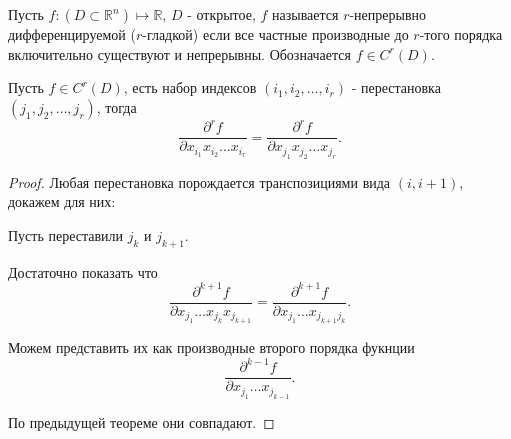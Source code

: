 \begin{definition} \thmslashn 

    Пусть $f : (D \subset \mathbb{R}^{n}) \mapsto \mathbb{R}$, $D$ - открытое, $f$ называется $r$-непрерывно дифференцируемой ($r$-гладкой) если все частные производные до $r$-того порядка включительно существуют и непрерывны. Обозначается $f\in C^{r}(D)$.
\end{definition}
\begin{theorem} \thmslashn

    Пусть $f\in C^{r}(D)$, есть набор индексов $(i_1, i_2, \ldots, i_{r})$ - перестановка $(j_1, j_2, \ldots, j_{r})$, тогда 
    \[ \frac{\partial^{r} f}{\partial x_{i_1}x_{i_2}\ldots x_{i_{r}}} = \frac{\partial^{r} f}{\partial x_{j_1}x_{j_2}\ldots x_{j_{r}}}   .\]
    \begin{proof} \thmslashn
    
        Любая перестановка порождается транспозициями вида $(i, i+1)$, докажем для них: 

        Пусть переставили $j_{k}$ и $j_{k+1}$.

        Достаточно показать что
        \[ \frac{\partial^{k+1} f}{\partial x_{j_1}\ldots x_{j_{k}}x_{j_{k+1}}} = \frac{\partial^{k+1} f}{\partial x_{j_1}\ldots x_{j_{k+1}j_{k}}}   .\]

        Можем представить их как производные второго порядка фукнции
        \[ \frac{\partial^{k-1} f}{\partial x_{j_1}\ldots x_{j_{k-1}}}  .\]

        По предыдущей теореме они совпадают.
    \end{proof}
\end{theorem}
